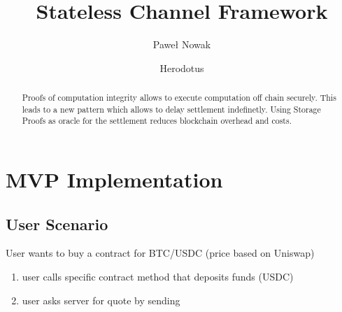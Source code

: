 \documentclass{article}
\begin{document}
\title{Stateless Channel Framework}

\author{Paweł Nowak \and Herodotus}

\begin{abstract}
Proofs of computation integrity allows to execute computation off chain securely.
This leads to a new pattern which allows to delay settlement indefinetly.
Using Storage Proofs as oracle for the settlement reduces blockchain overhead and costs.
\end{abstract}

\section*{MVP Implementation}

\subsection*{User Scenario}
User wants to buy a contract for BTC/USDC (price based on Uniswap)
\begin{enumerate}
    \item user calls specific contract method that deposits funds (USDC)
    \item user asks server for quote by sending
        
\end{enumerate}
\end{document}
